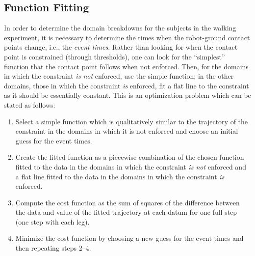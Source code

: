 \subsection{Function Fitting}
In order to determine the domain breakdowns for the subjects in the walking
experiment, it is necessary to determine the times when the robot-ground contact
points change, i.e., the {\em event times}.
%
Rather than looking for when the contact point is constrained (through
thresholds), one can look for the ``simplest'' function that the contact point
follows when not enforced.
%
Then, for the domains in which the constraint {\em is not} enforced, use the
simple function; in the other domains, those in which the constraint {\em is}
enforced, fit a flat line to the constraint as it should be essentially
constant.
%
This is an optimization problem which can be stated as follows:
\begin{enumerate}
\item Select a simple function which is qualitatively similar to the trajectory
  of the constraint in the domains in which it is not enforced and choose an
  initial guess for the event times.
\item Create the fitted function as a piecewise combination of the chosen
  function fitted to the data in the domains in which the constraint {\em is
    not} enforced and a flat line fitted to the data in the domains in which
  the constraint {\em is} enforced.
\item Compute the cost function as the sum of squares of the difference between
  the data and value of the fitted trajectory at each datum for one full step
  (one step with each leg).
\item Minimize the cost function by choosing a new guess for the event times
  and then repeating steps 2--4.
\end{enumerate}


